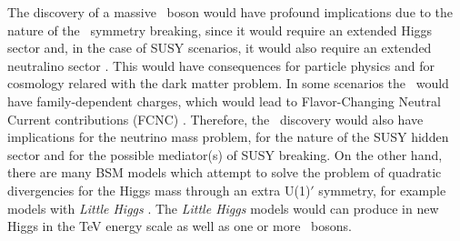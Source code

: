 The discovery of a massive \Zprime~boson would have profound implications due to the nature of 
the \Uprime~symmetry breaking, since it would require an extended Higgs sector and, in the case 
of SUSY scenarios, it would also require an extended neutralino sector \cite{Langacker:2008yv}. 
This would have consequences for particle physics and for cosmology relared with the dark matter problem. In some scenarios
the \Zprime~would have family-dependent charges, which would lead to Flavor-Changing Neutral Current 
contributions (FCNC) \cite{Langacker:2008yv}. Therefore, the \Zprime~discovery would also have implications for 
the neutrino mass problem, for the nature of the SUSY hidden sector and for the possible 
mediator(s) of SUSY breaking. On the other hand, there are many BSM models which attempt to 
solve the problem of quadratic divergencies for  the Higgs mass through an extra U(1)$'$ symmetry, 
for example models with \emph{Little Higgs} \cite{Langacker:2008yv}. The \emph{Little Higgs} models would
can produce in new Higgs in the TeV energy scale as well as one or more \Zprime~bosons.\\

